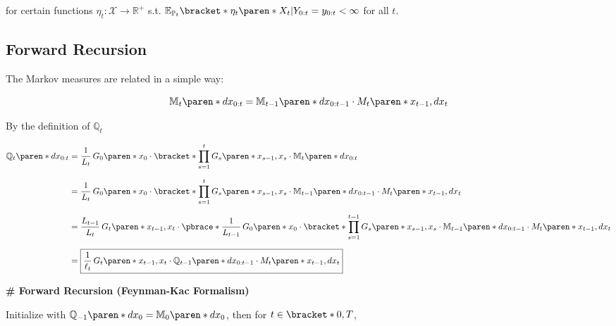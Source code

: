 for certain functions $\eta_{t} : \mathcal{X} \to \mathbb{R}^{+}$ s.t. $\mathbb{E}_{\mathbb{P}_{t}} \bracket*{ \eta_{t} \paren*{X_{t}} \vert Y_{0:t} = y_{0:t} } < \infty$ for all $t$.

\subsection{Forward Recursion}

The Markov measures are related in a simple way:

\begin{equation}
    \mathbb{M}_{t} \paren*{dx_{0:t}} =
        \mathbb{M}_{t-1} \paren*{dx_{0:t-1}} \cdot
        M_{t} \paren*{x_{t-1}, dx_{t}}
\end{equation}

By the definition of $\mathbb{Q}_{t}$

\begin{align}
    \mathbb{Q}_{t} \paren*{dx_{0:t}}&=
        \dfrac{1}{L_{t}} \,
        G_{0} \paren*{x_{0}} \cdot \bracket*{
            \prod_{s = 1}^{{t}} G_{s} \paren*{x_{s - 1}, x_{s}}
        }
        \cdot \mathbb{M}_{t} \paren*{dx_{0:t}}
    \nonumber \\[1.5ex] &=
        \dfrac{1}{L_{t}} \,
        G_{0} \paren*{x_{0}} \cdot \bracket*{
            \prod_{s = 1}^{{t}} G_{s} \paren*{x_{s - 1}, x_{s}}
        }
        \cdot \mathbb{M}_{t-1} \paren*{dx_{0:t-1}} \cdot
        M_{t} \paren*{x_{t-1}, dx_{t}}
    \nonumber \\[1.5ex] &=
        \dfrac{L_{t-1}}{L_{t}} \,
        G_{t} \paren*{x_{t - 1}, x_{t}} \cdot \pbrace*{
            \dfrac{1}{L_{t-1}} \,
            G_{0} \paren*{x_{0}} \cdot \bracket*{
                \prod_{s = 1}^{{t-1}} G_{s} \paren*{x_{s - 1}, x_{s}}
            }
            \cdot \mathbb{M}_{t-1} \paren*{dx_{0:t-1}}
        }
        \cdot M_{t} \paren*{x_{t-1}, dx_{t}}
    \nonumber \\[1.5ex] &=
        \boxed{
            \dfrac{1}{\ell_{t}} \,
            G_{t} \paren*{x_{t - 1}, x_{t}}
            \cdot \mathbb{Q}_{t-1} \paren*{dx_{0:t-1}}
            \cdot M_{t} \paren*{x_{t-1}, dx_{t}}
        }
\end{align}


\textbf{\# Forward Recursion (Feynman-Kac Formalism)}

Initialize with $\mathbb{Q}_{-1} \paren*{dx_{0}} = \mathbb{M}_{0} \paren*{dx_{0}}$, then for $t \in \bracket*{0, T}$,

